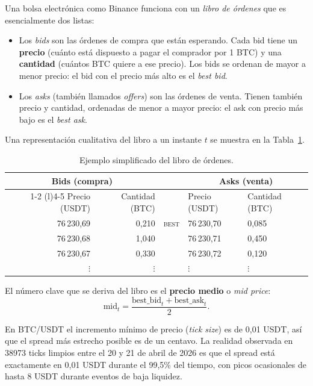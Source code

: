 \documentclass[journal,onecolumn,11pt]{IEEEtran}
\begin{document}
Una bolsa electrónica como Binance funciona con un \emph{libro de
órdenes} que es esencialmente dos listas:

\begin{itemize}
\item Los \emph{bids} son las órdenes de compra que están esperando.
      Cada bid tiene un \textbf{precio} (cuánto está dispuesto a pagar
      el comprador por 1 BTC) y una \textbf{cantidad} (cuántos BTC
      quiere a ese precio). Los bids se ordenan de mayor a menor precio:
      el bid con el precio más alto es el \emph{best bid}.
\item Los \emph{asks} (también llamados \emph{offers}) son las órdenes
      de venta. Tienen también precio y cantidad, ordenadas de menor a
      mayor precio: el ask con precio más bajo es el \emph{best ask}.
\end{itemize}

\noindent
Una representación cualitativa del libro a un instante $t$ se muestra
en la Tabla~\ref{tab:libro-ejemplo}.

\begin{table}[!htbp]
\caption{Ejemplo simplificado del libro de órdenes.}
\label{tab:libro-ejemplo}
\centering
\begin{tabular}{rrcll}
\toprule
\multicolumn{2}{c}{\textbf{Bids (compra)}} & & \multicolumn{2}{c}{\textbf{Asks (venta)}} \\
\cmidrule(r){1-2} \cmidrule(l){4-5}
Precio (USDT) & Cantidad (BTC) & & Precio (USDT) & Cantidad (BTC) \\
\midrule
76\,230{,}69 & 0{,}210 & \textsc{best} & 76\,230{,}70 & 0{,}085 \\
76\,230{,}68 & 1{,}040 &              & 76\,230{,}71 & 0{,}450 \\
76\,230{,}67 & 0{,}330 &              & 76\,230{,}72 & 0{,}120 \\
$\vdots$     & $\vdots$ &              & $\vdots$     & $\vdots$ \\
\bottomrule
\end{tabular}
\end{table}

El número clave que se deriva del libro es el \textbf{precio medio}
o \emph{mid price}:
\begin{equation}
\text{mid}_t = \frac{\text{best\_bid}_t + \text{best\_ask}_t}{2}.
\label{eq:mid}
\end{equation}

En BTC/USDT el incremento mínimo de precio (\emph{tick size}) es de
0{,}01 USDT, así que el spread más estrecho posible es de un centavo.
La realidad observada en \num{38973} ticks limpios entre el 20 y 21
de abril de 2026 es que el spread está exactamente en 0{,}01 USDT
durante el 99{,}5\% del tiempo, con picos ocasionales de hasta 8 USDT
durante eventos de baja liquidez.
\end{document}
